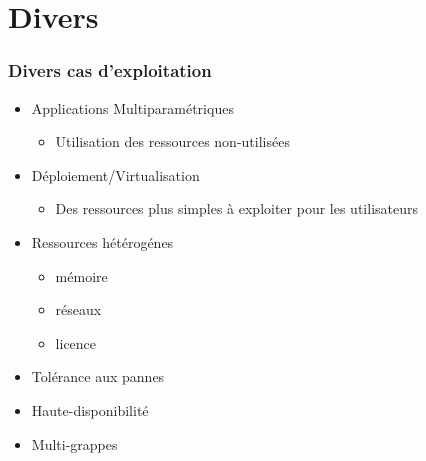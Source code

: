 \documentclass{beamer}
\begin{document}
\section{Divers}




\begin{frame}
	\frametitle{Divers cas d'exploitation}
	\begin{itemize}
		\item Applications Multiparamétriques
				\begin{itemize}
					\item Utilisation des ressources non-utilisées
				\end{itemize}

		\item Déploiement/Virtualisation
				\begin{itemize}
				  \item Des ressources plus simples à exploiter pour les utilisateurs	
				\end{itemize}
		\item Ressources hétérogénes 
				\begin{itemize}
				  \item mémoire
					\item réseaux
					\item licence
				\end{itemize}
		\item Tolérance aux pannes
		\item Haute-disponibilité
		\item Multi-grappes
	\end{itemize}
\end{frame}
\end{document}
